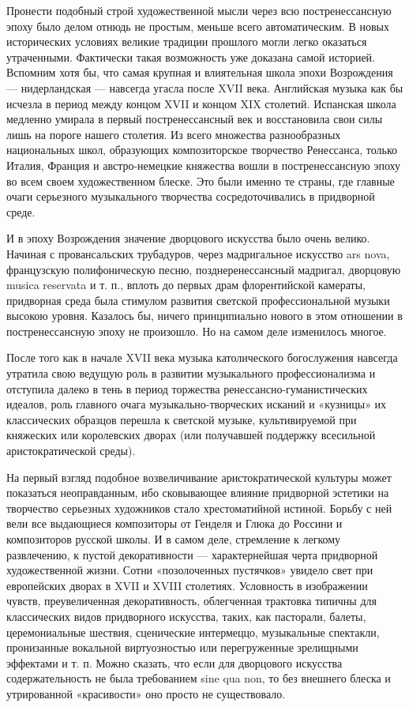 Пронести    подобный   строй    художественной    мысли   через    всю
постренессансную  эпоху было  делом  отнюдь не  простым, меньше  всего
автоматическим.  В   новых  исторических  условиях   великие  традиции
прошлого   могли  легко   оказаться   утраченными.  Фактически   такая
возможность уже доказана  самой историей. Вспомним хотя  бы, что самая
крупная  и  влиятельная  школа  эпохи Возрождения  —  нидерландская  —
навсегда угасла  после XVII века.  Английская музыка как бы  исчезла в
период  между  концом XVII  и  концом  XIX столетий.  Испанская  школа
медленно  умирала   в  первый  постренессансный  век   и  восстановила
свои  силы  лишь  на  пороге   нашего  столетия.  Из  всего  множества
разнообразных национальных школ,  образующих композиторское творчество
Ренессанса, только Италия, Франция и австро-немецкие княжества вошли в
постренессансную эпоху  во всем своем художественном  блеске. Это были
именно те страны, где главные очаги серьезного музыкального творчества
сосредоточивались в придворной среде.

И в эпоху Возрождения значение дворцового искусства было очень велико.
Начиная  с  провансальских  трубадуров, через  мадригальное  искусство
ars   nova,  французскую   полифоническую  песню,   позднеренессансный
мадригал,  дворцовую  musica  reservata  и т.  п.,  вплоть  до  первых
драм флорентийской  камераты, придворная среда была  стимулом развития
светской профессиональной  музыки высокою уровня. Казалось  бы, ничего
принципиально  нового в  этом  отношении в  постренессансную эпоху  не
произошло. Но на самом деле изменилось многое.

После   того   как   в   начале   XVII   века   музыка   католического
богослужения   навсегда  утратила   свою  ведущую   роль  в   развитии
музыкального   профессионализма   и   отступила  далеко   в   тень   в
период  торжества ренессансно-гуманистических  идеалов, роль  главного
очага  музыкально-творческих  исканий   и  «кузницы»  их  классических
образцов  перешла  к  светской музыке,  культивируемой  при  княжеских
или   королевских   дворах   (или  получавшей   поддержку   всесильной
аристократической среды).

На  первый взгляд  подобное возвеличивание  аристократической культуры
может  показаться неоправданным,  ибо  сковывающее влияние  придворной
эстетики  на  творчество  серьезных  художников  стало  хрестоматийной
истиной.  Борьбу с  ней  вели все  выдающиеся  композиторы от  Генделя
и  Глюка  до   Россини  и  композиторов  русской  школы.   И  в  самом
деле,  стремление  к  легкому  развлечению,  к  пустой  декоративности
---  характернейшая  черта   придворной  художественной  жизни.  Сотни
«позолоченных пустячков» увидело свет при  европейских дворах в XVII и
XVIII  столетиях.  Условность  в  изображении  чувств,  преувеличенная
декоративность, облегченная  трактовка типичны для  классических видов
придворного  искусства, таких,  как пасторали,  балеты, церемониальные
шествия,  сценические интермеццо,  музыкальные спектакли,  пронизанные
вокальной виртуозностью или перегруженные зрелищными эффектами и т. п.
Можно сказать,  что если для дворцового  искусства содержательность не
была требованием sine  qua non, то без внешнего  блеска и утрированной
«красивости» оно просто не существовало.

